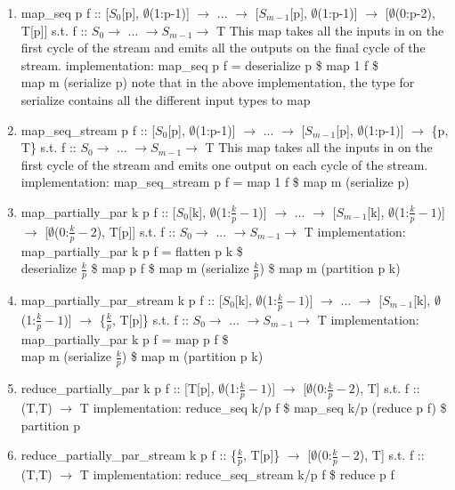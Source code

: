 \documentclass[11pt,fleqn]{article}
\numberwithin{equation}{subsection}
\begin{document}
\begin{enumerate}
    \item map\_seq p f :: [$S_0$[p], $\emptyset$(1:p-1)] $\rightarrow$ ...
        $\rightarrow$ [$S_{m-1}$[p], $\emptyset$(1:p-1)] $\rightarrow$
        [$\emptyset$(0:p-2), T[p]]
        \subitem s.t. f :: $S_0 \rightarrow$ ... $\rightarrow S_{m-1} \rightarrow$ T
        \subitem This map takes all the inputs in on the first cycle of the 
        stream and emits all the outputs on the final cycle of the stream.
        \subitem implementation: map\_seq p f = deserialize p \$ map 1 f \$ \\ map m (serialize p)
        \subitem note that in the above implementation, the type for serialize 
        contains all the different input types to map
    \item map\_seq\_stream p f :: [$S_0$[p], $\emptyset$(1:p-1)] $\rightarrow$ ...
        $\rightarrow$ [$S_{m-1}$[p], $\emptyset$(1:p-1)] $\rightarrow$
        \{p, T\}
        \subitem s.t. f :: $S_0 \rightarrow$ ... $\rightarrow S_{m-1} \rightarrow$ T
        \subitem This map takes all the inputs in on the first cycle of the 
        stream and emits one output on each cycle of the stream.
        \subitem implementation: map\_seq\_stream p f = map 1 f \$ map m (serialize p)
    \item map\_partially\_par k p f :: [$S_0$[k], $\emptyset$(1:$\frac{k}{p}-1$)] 
        $\rightarrow$ ... $\rightarrow$ 
        [$S_{m-1}$[k], $\emptyset$(1:$\frac{k}{p}-1$)] $\rightarrow$
        [$\emptyset$(0:$\frac{k}{p}-2$), T[p]]
        \subitem s.t. f :: $S_0 \rightarrow$ ... $\rightarrow S_{m-1} \rightarrow$ T
        \subitem implementation: map\_partially\_par k p f = flatten p k \$ \\ 
        deserialize $\frac{k}{p}$ \$ map p f \$ map m (serialize $\frac{k}{p}$) \$ map m (partition p k)
    \item map\_partially\_par\_stream k p f :: [$S_0$[k], $\emptyset$(1:$\frac{k}{p}-1$)] 
        $\rightarrow$ ... $\rightarrow$ 
        [$S_{m-1}$[k], $\emptyset$(1:$\frac{k}{p}-1$)] $\rightarrow$
        \{$\frac{k}{p}$, T[p]\}
        \subitem s.t. f :: $S_0 \rightarrow$ ... $\rightarrow S_{m-1} \rightarrow$ T
        \subitem implementation: map\_partially\_par k p f = map p f \$ \\ 
        map m (serialize $\frac{k}{p}$) \$ map m (partition p k)
    \item reduce\_partially\_par k p f :: [T[p], $\emptyset$(1:$\frac{k}{p}-1$)] 
        $\rightarrow$ [$\emptyset$(0:$\frac{k}{p}-2$), T]
        \subitem s.t. f :: (T,T) $\rightarrow$ T
        \subitem implementation: reduce\_seq k/p f \$ map\_seq k/p (reduce p f) 
        \$ partition p
    \item reduce\_partially\_par\_stream k p f :: \{$\frac{k}{p}$, T[p]\}
        $\rightarrow$ [$\emptyset$(0:$\frac{k}{p}-2$), T]
        \subitem s.t. f :: (T,T) $\rightarrow$ T
        \subitem implementation: reduce\_seq\_stream k/p f \$ reduce p f
\end{enumerate}
\end{document}
